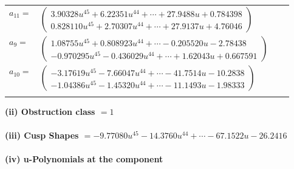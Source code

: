 \documentclass[1p]{elsarticle_modified}
\theoremstyle{definition}
\begin{document}
\begin{tabular}{m{7pt} m{180pt} m{7pt} m{180pt} }
\flushright $a_{11}=$&$\begin{pmatrix}3.90328 u^{45}+6.22351 u^{44}+\cdots+27.9488 u+0.784398\\0.828110 u^{45}+2.70307 u^{44}+\cdots+27.9137 u+4.76046\end{pmatrix}$ \\
\flushright $a_{9}=$&$\begin{pmatrix}1.08755 u^{45}+0.808923 u^{44}+\cdots-0.205520 u-2.78438\\-0.970295 u^{45}-0.436029 u^{44}+\cdots+1.62043 u+0.667591\end{pmatrix}$ \\
\flushright $a_{10}=$&$\begin{pmatrix}-3.17619 u^{45}-7.66047 u^{44}+\cdots-41.7514 u-10.2838\\-1.04386 u^{45}-1.45320 u^{44}+\cdots-11.1493 u-1.98333\end{pmatrix}$\\&\end{tabular}
\flushleft \textbf{(ii) Obstruction class $= 1$}\\~\\
\flushleft \textbf{(iii) Cusp Shapes $= -9.77080 u^{45}-14.3760 u^{44}+\cdots-67.1522 u-26.2416$}\\~\\
\newpage\renewcommand{\arraystretch}{1}
\flushleft \textbf{(iv) u-Polynomials at the component}\newline \\
\end{document}
